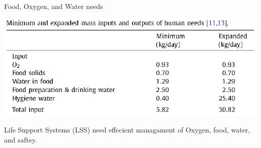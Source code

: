 \documentclass{beamer}
\begin{document}
 

    
    
  \begin{frame}{Food, Oxygen, and Water needs}
      \begin{center}
             \includegraphics[width= \textwidth]{Human_needs.eps}   
      \end{center}  
              Life Support Systems (LSS) need effecient managament of Oxygen, food, water, and saftey.\cite{Belz}

    \end{frame}
\end{document}
